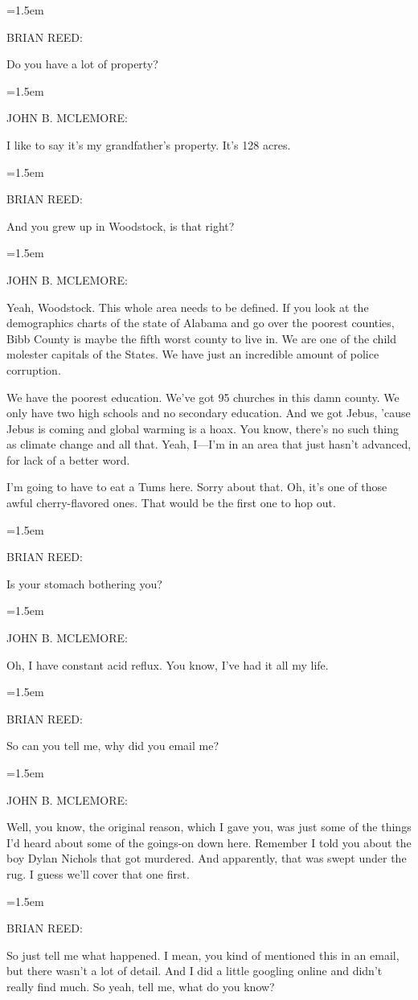 \documentclass[10pt,a4paper]{article}
\newcommand{\speakerlabel}[1]{{\plantin\color{speakerblue}\MakeUppercase{#1}:}}
\newenvironment{speech}[1]{%
		\par\medskip
		\begin{list}{}{%
			\leftmargin=1.5em
			\rightmargin=0pt
			\topsep=0pt
			\partopsep=0pt
			\parsep=0.5\baselineskip
			\itemsep=0pt}%
		\item\speakerlabel{#1}\enspace\ignorespaces
	}{\end{list}}
\begin{document}
\begin{speech}{BRIAN REED}
Do you have a lot of property?
\end{speech}
\begin{speech}{JOHN B. McLEMORE}
I like to say it's my grandfather's property. It's 128 acres.
\end{speech}
\begin{speech}{BRIAN REED}
And you grew up in Woodstock, is that right?
\end{speech}
\begin{speech}{JOHN B. McLEMORE}
Yeah, Woodstock. This whole area needs to be defined. If you look at the demographics charts of the state of Alabama and go over the poorest counties, Bibb County is maybe the fifth worst county to live in. We are one of the child molester capitals of the States. We have just an incredible amount of police corruption.

We have the poorest education. We've got 95 churches in this damn county. We only have two high schools and no secondary education. And we got Jebus, 'cause Jebus is coming and global warming is a hoax. You know, there's no such thing as climate change and all that. Yeah, I—I'm in an area that just hasn't advanced, for lack of a better word.

I'm going to have to eat a Tums here. Sorry about that. Oh, it's one of those awful cherry-flavored ones. That would be the first one to hop out.
\end{speech}
\begin{speech}{BRIAN REED}
Is your stomach bothering you?
\end{speech}
\begin{speech}{JOHN B. McLEMORE}
Oh, I have constant acid reflux. You know, I've had it all my life.
\end{speech}
\begin{speech}{BRIAN REED}
So can you tell me, why did you email me?
\end{speech}
\begin{speech}{JOHN B. McLEMORE}
Well, you know, the original reason, which I gave you, was just some of the things I'd heard about some of the goings-on down here. Remember I told you about the boy Dylan Nichols that got murdered. And apparently, that was swept under the rug. I guess we'll cover that one first.
\end{speech}
\begin{speech}{BRIAN REED}
So just tell me what happened. I mean, you kind of mentioned this in an email, but there wasn't a lot of detail. And I did a little googling online and didn't really find much. So yeah, tell me, what do you know?
\end{speech}
\end{document}
